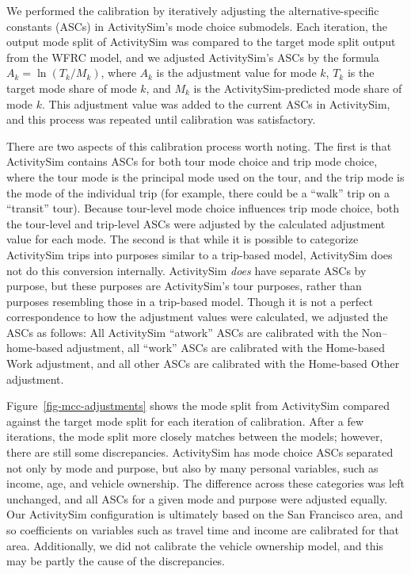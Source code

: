 \documentclass[fancy, oneside, mastersfancy, ms]{byuthesis}
\begin{document}
We performed the calibration by iteratively adjusting the
alternative-specific constants (ASCs) in ActivitySim's mode choice
submodels. Each iteration, the output mode split of ActivitySim was
compared to the target mode split output from the WFRC model, and we
adjusted ActivitySim's ASCs by the formula \(A_k = \ln(T_k/M_k)\), where
\(A_k\) is the adjustment value for mode \(k\), \(T_k\) is the target
mode share of mode \(k\), and \(M_k\) is the ActivitySim-predicted mode
share of mode \(k\). This adjustment value was added to the current ASCs
in ActivitySim, and this process was repeated until calibration was
satisfactory.

There are two aspects of this calibration process worth noting. The
first is that ActivitySim contains ASCs for both tour mode choice and
trip mode choice, where the tour mode is the principal mode used on the
tour, and the trip mode is the mode of the individual trip (for example,
there could be a ``walk'' trip on a ``transit'' tour). Because
tour-level mode choice influences trip mode choice, both the tour-level
and trip-level ASCs were adjusted by the calculated adjustment value for
each mode. The second is that while it is possible to categorize
ActivitySim trips into purposes similar to a trip-based model,
ActivitySim does not do this conversion internally. ActivitySim
\emph{does} have separate ASCs by purpose, but these purposes are
ActivitySim's tour purposes, rather than purposes resembling those in a
trip-based model. Though it is not a perfect correspondence to how the
adjustment values were calculated, we adjusted the ASCs as follows: All
ActivitySim ``atwork'' ASCs are calibrated with the Non--home-based
adjustment, all ``work'' ASCs are calibrated with the Home-based Work
adjustment, and all other ASCs are calibrated with the Home-based Other
adjustment.

Figure~\ref{fig-mcc-adjustments} shows the mode split from ActivitySim
compared against the target mode split for each iteration of
calibration. After a few iterations, the mode split more closely matches
between the models; however, there are still some discrepancies.
ActivitySim has mode choice ASCs separated not only by mode and purpose,
but also by many personal variables, such as income, age, and vehicle
ownership. The difference across these categories was left unchanged,
and all ASCs for a given mode and purpose were adjusted equally. Our
ActivitySim configuration is ultimately based on the San Francisco area,
and so coefficients on variables such as travel time and income are
calibrated for that area. Additionally, we did not calibrate the vehicle
ownership model, and this may be partly the cause of the discrepancies.
\end{document}
